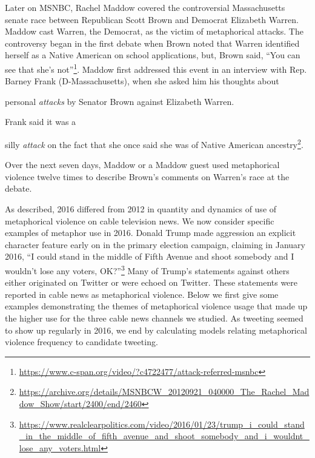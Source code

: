 Later on MSNBC,
Rachel Maddow covered the controversial Massachusetts
senate race between Republican Scott Brown and Democrat Elizabeth Warren. 
Maddow cast Warren, the Democrat, as the victim of metaphorical attacks. 
The controversy began in the first debate when Brown noted 
that Warren identified herself as a 
Native American on school applications, but, Brown said, ``You can see that she's not''\footnote{\url{https://www.c-span.org/video/?c4722477/attack-referred-msnbc}}. 
Maddow first addressed this event in an interview with Rep. Barney 
Frank (D-Massachusetts), when she asked him his thoughts about 
\begin{exe}
  \ex personal \emph{attacks} by Senator Brown against Elizabeth Warren.
\end{exe}
Frank said it was a 
\begin{exe}
  \ex silly \emph{attack} on the fact that she once said she was of Native American 
  ancestry\footnote{\url{https://archive.org/details/MSNBCW_20120921_040000_The_Rachel_Maddow_Show/start/2400/end/2460}}.
\end{exe}
Over the next seven days, Maddow or a Maddow guest used metaphorical
violence twelve times to describe Brown's comments on Warren's race at the 
debate. 

As described, 2016 differed from 2012 in quantity and
dynamics of use of metaphorical violence on cable television news. 
We now consider specific examples of metaphor use in
2016.  Donald Trump made aggression an explicit character
feature early on in the primary election campaign, 
claiming in January 2016, ``I could stand in the middle of Fifth Avenue
and shoot somebody and I wouldn't lose any voters, OK?''\footnote{\url{https://www.realclearpolitics.com/video/2016/01/23/trump_i_could_stand_in_the_middle_of_fifth_avenue_and_shoot_somebody_and_i_wouldnt_lose_any_voters.html}}
Many of Trump's statements against others either originated on Twitter 
or were echoed on Twitter. These statements were reported in 
cable news as metaphorical violence. 
Below we first give some examples demonstrating the themes of metaphorical
violence usage that made up the higher use for the three cable 
news channels we studied. As tweeting seemed to show up
regularly in 2016, we end by calculating models relating
metaphorical violence frequency to candidate tweeting.


